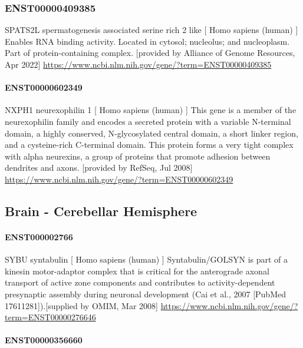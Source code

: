 \documentclass[
]{article}
\begin{document}
\hypertarget{enst00000409385}{%
\subsubsection{ENST00000409385}\label{enst00000409385}}

SPATS2L spermatogenesis associated serine rich 2 like {[} Homo sapiens
(human) {]} Enables RNA binding activity. Located in cytosol; nucleolus;
and nucleoplasm. Part of protein-containing complex. {[}provided by
Alliance of Genome Resources, Apr 2022{]}
\url{https://www.ncbi.nlm.nih.gov/gene/?term=ENST00000409385}

\hypertarget{enst00000602349}{%
\paragraph{ENST00000602349}\label{enst00000602349}}

NXPH1 neurexophilin 1 {[} Homo sapiens (human) {]} This gene is a member
of the neurexophilin family and encodes a secreted protein with a
variable N-terminal domain, a highly conserved, N-glycosylated central
domain, a short linker region, and a cysteine-rich C-terminal domain.
This protein forms a very tight complex with alpha neurexins, a group of
proteins that promote adhesion between dendrites and axons. {[}provided
by RefSeq, Jul 2008{]}
\url{https://www.ncbi.nlm.nih.gov/gene/?term=ENST00000602349}

\hypertarget{brain---cerebellar-hemisphere}{%
\subsection{Brain - Cerebellar
Hemisphere}\label{brain---cerebellar-hemisphere}}

\hypertarget{enst000002766}{%
\paragraph{ENST000002766}\label{enst000002766}}

SYBU syntabulin {[} Homo sapiens (human) {]} Syntabulin/GOLSYN is part
of a kinesin motor-adaptor complex that is critical for the anterograde
axonal transport of active zone components and contributes to
activity-dependent presynaptic assembly during neuronal development (Cai
et al., 2007 {[}PubMed 17611281{]}).{[}supplied by OMIM, Mar 2008{]}
\url{https://www.ncbi.nlm.nih.gov/gene/?term=ENST00000276646}

\hypertarget{enst00000356660}{%
\paragraph{ENST00000356660}\label{enst00000356660}}
\end{document}
